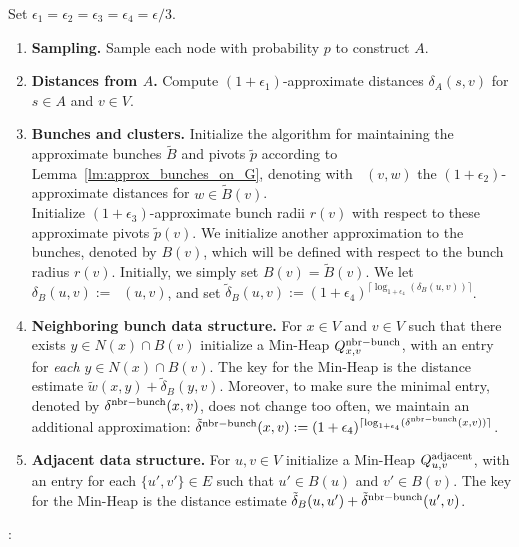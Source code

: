 \documentclass[11pt]{article}
\theoremstyle{definition}
\theoremstyle{remark}
\DeclareMathOperator{\dLNbunch}{\delta_{\tilde{B}}}
\begin{document}
\begin{titlepage}
Set $\epsilon_1=\epsilon_2=\epsilon_3=\epsilon_4=\epsilon/3$.
\begin{enumerate}
    \item \textbf{Sampling.} Sample each node with probability $p$ to construct $A$. \label{step:sampling}
    \item \textbf{Distances from $A$.} Compute $(1+\epsilon_1)$-approximate distances $\delta_A(s,v)$ for $s\in A$ and $v\in V$. 
    \item \textbf{Bunches and clusters.} Initialize the algorithm for maintaining the approximate bunches $\tilde B$ and pivots $\tilde p$ according to Lemma~\ref{lm:approx_bunches_on_G}, denoting with $\dLNbunch(v,w)$ the $(1+\epsilon_2)$-approximate distances for $w\in \tilde B(v)$.\\
    Initialize $(1+\epsilon_3)$-approximate bunch radii $r(v)$ with respect to these approximate pivots $\tilde p(v)$.  \label{step:A_MSSP}
    We initialize another approximation to the bunches, denoted by $B(v)$, which will be defined with respect to the bunch radius $r(v)$. Initially, we simply set $B(v)=\tilde{B}(v)$. We let $\delta_B(u,v):=\dLNbunch(u,v)$, and set $\tilde \delta_B(u,v) := (1+\epsilon_4)^{\lceil \log_{1+\epsilon_4}(\delta_B(u,v))\rceil}$. \label{step:bunches}
    \item \textbf{Neighboring bunch data structure.} For $x\in V$ and $v\in V$ such that there exists $y\in N(x)\cap B(v)$ initialize a Min-Heap $Q^{\rm{nbr-bunch}}_{x,v}$, with an entry for \emph{each} $y\in N(x)\cap B(v)$. The key for the Min-Heap is the distance estimate $ \tilde w (x, y) + \tilde\delta_B (y, v) $. Moreover, to make sure the minimal entry, denoted by $\delta^{\rm{nbr-bunch}}(x,v)$, does not change too often, we maintain an additional approximation: $\tilde \delta^{\rm{nbr-bunch}}(x,v):= (1+\epsilon_4)^{\lceil \log_{1+\epsilon_4}(\delta^{\rm{nbr-bunch}}(x,v))\rceil}$. \label{step:init_nbr_bunch}
    \item \textbf{Adjacent data structure.} For $u,v\in V$ initialize a Min-Heap $Q^{\rm{adjacent}}_{u,v}$, with an entry for each $\{u',v'\}\in E$ such that $u'\in B(u)$ and $v' \in B(v)$. The key for the Min-Heap is the distance estimate $\tilde \delta_B(u,u')+\tilde \delta^{\rm{nbr-bunch}}(u',v)$. \label{step:min_heap_nbr} 
\end{enumerate}

\noindent{}:\\
\indent {}\\


\end{titlepage}
\end{document}
